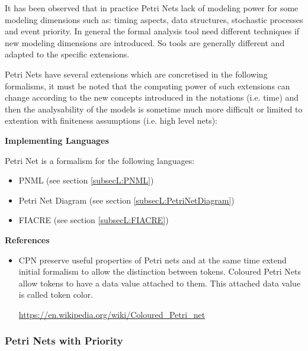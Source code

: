 It has been observed that in practice Petri Nets lack of modeling power for some modeling dimensions such as: timing aspects, data structures, stochastic processes and event priority. In general the formal analysis tool need different techniques if new modeling dimensions are introduced. So tools are generally different and adapted to the specific extensions.

Petri Nets have several extensions which are concretised in the following formalisms, it must be noted that the computing power of such extensions can change according to the new concepts introduced in the notations (i.e. time) and then the analysability of the models is sometime much more difficult or limited to extention with finiteness assumptions (i.e. high level nets):

\textbf{Implementing Languages}

Petri Net is a formalism for the following languages:
\begin{itemize}
	\item PNML (see section \ref{subsecL:PNML})
	\item Petri Net Diagram (see section \ref{subsecL:PetriNetDiagram})
	\item FIACRE (see section \ref{subsecL:FIACRE})
\end{itemize}





\textbf{References}
\begin{itemize}
	
\item CPN preserve useful properties of Petri nets and at the same time extend initial formalism to allow the distinction between tokens.
Coloured Petri Nets allow tokens to have a data value attached to them. This attached data value is called token color. 

\url{https://en.wikipedia.org/wiki/Coloured_Petri_net}
\end{itemize}



\subsubsection{Petri Nets with Priority}
\label{subsecF:PetriNetsPrioritised}


